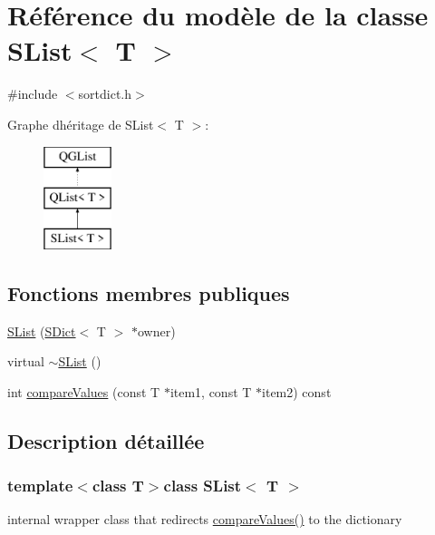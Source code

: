 \hypertarget{class_s_list}{}\section{Référence du modèle de la classe S\+List$<$ T $>$}
\label{class_s_list}


{\ttfamily \#include $<$sortdict.\+h$>$}

Graphe d\textquotesingle{}héritage de S\+List$<$ T $>$\+:\begin{figure}[H]
\begin{center}
\leavevmode
\includegraphics[height=3.000000cm]{class_s_list}
\end{center}
\end{figure}
\subsection*{Fonctions membres publiques}
\begin{DoxyCompactItemize}
\item 
\hyperlink{class_s_list_a1295b39ee8f007fa3d35a1a41d7db6fe}{S\+List} (\hyperlink{class_s_dict}{S\+Dict}$<$ T $>$ $\ast$owner)
\item 
virtual \hyperlink{class_s_list_a65ba4ce097900693d480a5f1ff5f2fdd}{$\sim$\+S\+List} ()
\item 
int \hyperlink{class_s_list_a46c7527f67f4e55b8f2a37fff4ec4da3}{compare\+Values} (const T $\ast$item1, const T $\ast$item2) const 
\end{DoxyCompactItemize}


\subsection{Description détaillée}
\subsubsection*{template$<$class T$>$class S\+List$<$ T $>$}

internal wrapper class that redirects \hyperlink{class_s_list_a46c7527f67f4e55b8f2a37fff4ec4da3}{compare\+Values()} to the dictionary 

